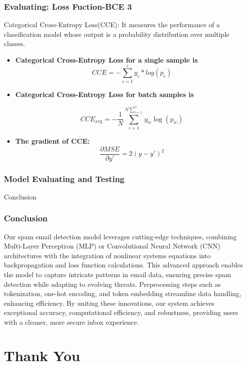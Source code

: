 \documentclass[aspectratio=1610]{beamer}
\begin{document}
\begin{frame}
    \frametitle{Evaluating: Loss Fuction-BCE 3}
    Categorical Cross-Entropy Loss(CCE): It measures the performance of a classification 
    model whose output is a probability distribution over multiple classes. 
    \vspace{0.5cm}

    \begin{itemize}

        \item  \textbf{Categorical Cross-Entropy Loss for a single sample is} 
        \[
            CCE = - \sum_{c=1}^{c} y_\text{c} * log(p_\text{c})
        \]

        \item \textbf{Categorical Cross-Entropy Loss for batch samples is }
        
\[
CCE_{\text{avg}} = - \frac{1}{N} \sum_{i=1}^{N\sum_{c=1}^{C}}  y_{ic} \log(p_{ic})
\]
        
        \item \textbf{The gradient of CCE:}
       \[
       \frac{\partial MSE}{\partial y'} =  2(y-y')^2
       \]
    \end{itemize}


\end{frame}

\begin{frame}
    \frametitle{Model Evaluating and Testing}

\end{frame}



\begin{frame}{Conclusion}
    \frametitle{Conclusion}
    Our spam email detection model leverages cutting-edge techniques, 
    combining Multi-Layer Perceptron (MLP) or 
    Convolutional Neural Network (CNN) 
    architectures with the integration of nonlinear systems equations into backpropagation 
    and loss function calculations. This advanced approach enables the model to capture intricate patterns in email data, ensuring precise spam detection while adapting to evolving threats. Preprocessing steps such as tokenization, one-hot encoding, and token embedding streamline data handling, enhancing efficiency. By uniting these innovations, our system achieves exceptional accuracy, computational efficiency, and robustness, providing users with a cleaner, more secure inbox experience.
    
\end{frame}

\section{Thank You}
\end{document}
